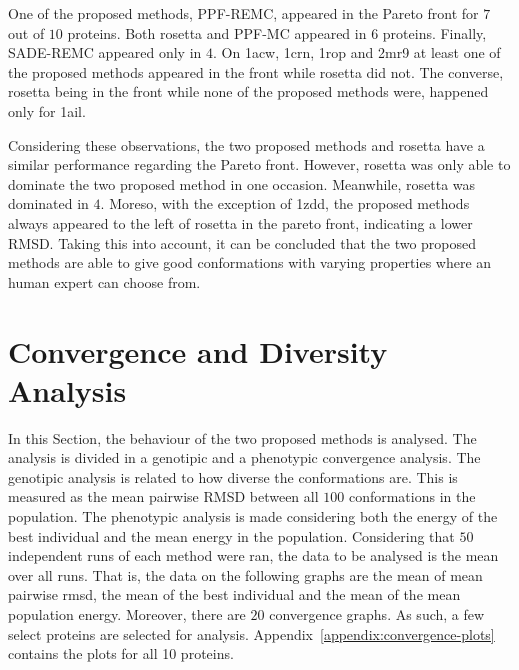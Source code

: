 One of the proposed methods, PPF-REMC, appeared in the Pareto front for $7$ out of 
$10$ proteins. Both rosetta and PPF-MC appeared in $6$ proteins. Finally,
SADE-REMC appeared only in $4$. On 1acw, 1crn, 1rop and 2mr9 at least one of the
proposed methods appeared in the front while rosetta did not. The converse,
rosetta being in the front while none of the proposed methods were, happened
only for 1ail.

Considering these observations, the two proposed methods and rosetta have a
similar performance regarding the Pareto front. However, rosetta was only
able to dominate the two proposed method in one occasion. Meanwhile, rosetta was
dominated in $4$.
Moreso, with the exception of 1zdd, the proposed methods
always appeared to the left of rosetta in the pareto front, indicating
a lower RMSD.
Taking this into account, it can be concluded that the two
proposed methods are able to give good conformations with varying properties
where an human expert can choose from.

\section{Convergence and Diversity Analysis}
\label{sec:convergence-analysis}

In this Section, the behaviour of the two proposed methods is analysed. The
analysis is divided in a genotipic and a phenotypic convergence analysis. The
genotipic analysis is related to how diverse the conformations are. This is
measured as the mean pairwise RMSD between all $100$ conformations in the
population. The phenotypic analysis is made considering both the energy of
the best individual and the mean energy in the population. Considering that
$50$ independent runs of each method were ran, the data to be analysed is
the mean over all runs. That is, the data on the following graphs are
the mean of mean pairwise rmsd, the mean of the best individual and the mean
of the mean population energy. Moreover, there are $20$ convergence graphs. As such,
a few select proteins are selected for analysis.
Appendix~\ref{appendix:convergence-plots} contains the plots for all 10
proteins.

